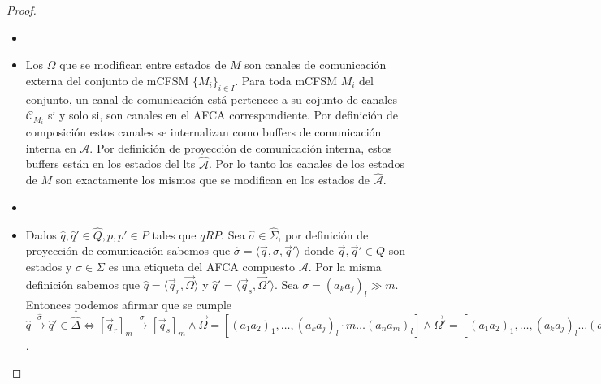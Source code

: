 \begin{prop}
\begin{proof}
\begin{itemize}
    \item[\textbf{Buffers} $\impliedby$]
    \item Los $\Omega$ que se modifican entre estados de $M$ son canales de comunicación externa del conjunto de mCFSM $\{M_i\}_{i \in I}$. Para toda mCFSM $M_i$ del conjunto, un canal de comunicación está pertenece a su cojunto de canales $\mathcal{C}_{M_i}$ si y solo si, son canales en el AFCA correspondiente. Por definición de composición estos canales se internalizan como buffers de comunicación interna en $\mathcal{A}$. Por definición de proyección de comunicación interna, estos buffers están en los estados del lts $\hat{\mathcal{A}}$. Por lo tanto los canales de los estados de $M$ son exactamente los mismos que se modifican en los estados de $\hat{\mathcal{A}}$.
    
    \item[\textbf{Transiciones} $\implies$]
    \item[i] Dados $\hat{q}, \hat{q}' \in \hat{Q}, p, p' \in P$ tales que $qRP$. Sea $\hat{\sigma} \in \hat{\Sigma}$, por definición de proyección de comunicación sabemos que $\hat{\sigma} = \langle \overrightarrow{q}, \sigma, \overrightarrow{q}' \rangle$ donde $\overrightarrow{q}, \overrightarrow{q}' \in Q$ son estados y $\sigma \in \Sigma$ es una etiqueta del AFCA compuesto $\mathcal{A}$. Por la misma definición sabemos que $\hat{q} = \langle \overrightarrow{q}_r, \overrightarrow{\Omega} \rangle$ y $\hat{q}' = \langle \overrightarrow{q}_s, \overrightarrow{\Omega}' \rangle$. Sea $\sigma = (a_ka_j)_l \gg m$.  Entonces podemos afirmar que se cumple $\hat{q} \xrightarrow{\hat{\sigma}} \hat{q}' \in \hat{\Delta} \iff [\overrightarrow{q}_r]_m \xrightarrow{\sigma} [\overrightarrow{q}_s]_m \land \overrightarrow{\Omega} = [(a_1a_2)_1, \ldots, (a_ka_j)_l \cdot m \ldots (a_na_m)_l] \land \overrightarrow{\Omega}' = [(a_1a_2)_1, \ldots, (a_ka_j)_l \ldots (a_na_m)_l] \rangle \land \overrightarrow{q} \in [\overrightarrow{q}_r]_m \land \overrightarrow{q}' \in [\overrightarrow{q}_s]_m$.
    

\end{itemize}
\end{proof}
\end{prop}
